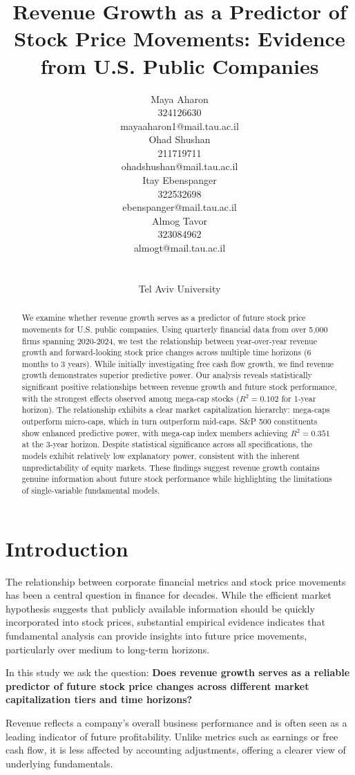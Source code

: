 \documentclass[11pt]{article}
\title{Revenue Growth as a Predictor of Stock Price Movements: Evidence from U.S. Public Companies}
\author{
\begin{tabular}{c}
Maya Aharon \\
\small{324126630} \\
\small{mayaaharon1@mail.tau.ac.il}
\end{tabular}
\quad
\begin{tabular}{c}
Ohad Shushan \\
\small{211719711} \\
\small{ohadshushan@mail.tau.ac.il}
\end{tabular}
\quad
\begin{tabular}{c}
Itay Ebenspanger \\
\small{322532698} \\
\small{ebenspanger@mail.tau.ac.il}
\end{tabular}
\quad
\begin{tabular}{c}
Almog Tavor \\
\small{323084962} \\
\small{almogt@mail.tau.ac.il}
\end{tabular} \\
\\Tel Aviv University
}
\begin{document}
\maketitle
\begin{abstract}
We examine whether revenue growth serves as a predictor of future stock price movements for U.S. public companies. Using quarterly financial data from over 5,000 firms spanning 2020-2024, we test the relationship between year-over-year revenue growth and forward-looking stock price changes across multiple time horizons (6 months to 3 years). While initially investigating free cash flow growth, we find revenue growth demonstrates superior predictive power. Our analysis reveals statistically significant positive relationships between revenue growth and future stock performance, with the strongest effects observed among mega-cap stocks ($R^2 = 0.102$ for 1-year horizon). The relationship exhibits a clear market capitalization hierarchy: mega-caps outperform micro-caps, which in turn outperform mid-caps. S\&P 500 constituents show enhanced predictive power, with mega-cap index members achieving $R^2 = 0.351$ at the 3-year horizon. Despite statistical significance across all specifications, the models exhibit relatively low explanatory power, consistent with the inherent unpredictability of equity markets. These findings suggest revenue growth contains genuine information about future stock performance while highlighting the limitations of single-variable fundamental models.
\end{abstract}

\section{Introduction}

The relationship between corporate financial metrics and stock price movements has been a central question in finance for decades. While the efficient market hypothesis suggests that publicly available information should be quickly incorporated into stock prices, substantial empirical evidence indicates that fundamental analysis can provide insights into future price movements, particularly over medium to long-term horizons.

In this study we ask the question: \textbf{Does revenue growth serves as a reliable predictor of future stock price changes across different market capitalization tiers and time horizons?}

Revenue reflects a company’s overall business performance and is often seen as a leading indicator of future profitability. Unlike metrics such as earnings or free cash flow, it is less affected by accounting adjustments, offering a clearer view of underlying fundamentals.
\end{document}
